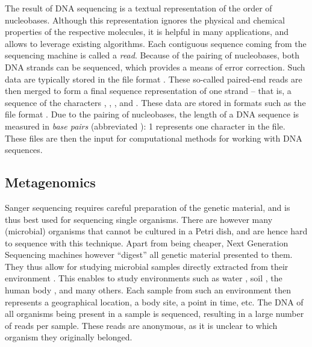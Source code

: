 The result of DNA sequencing is a textual representation of the order of nucleobases.
Although this representation ignores the physical and chemical properties of the respective molecules,
it is helpful in many applications, and allows to leverage existing algorithms.
Each contiguous sequence coming from the sequencing machine is called a \emph{read}.
Because of the pairing of nucleobases,
both DNA strands can be sequenced, which provides a means of error correction.
Such data are typically stored in the  file format \citep{Cock2009}.
These so-called paired-end reads are then merged to form a final sequence representation of one strand
-- that is, a sequence of the characters , , , and .
These data are stored in formats such as the  file format \citep{Pearson1988}.
Due to the pairing of nucleobases,
the length of a DNA sequence is measured in \emph{base pairs} (abbreviated \si{\basepair}):
\SI{1}{\basepair} represents one character in the file.
These files are then the input for computational methods for working with DNA sequences.



\subsection{Metagenomics}
\label{ch:Foundations:sec:SequenceAnalysis:sub:Metagenomics}

Sanger sequencing requires careful preparation of the genetic material,
and is thus best used for sequencing single organisms.
There are however many (microbial) organisms that cannot be cultured in a Petri dish,
and are hence hard to sequence with this technique.
Apart from being cheaper, Next Generation Sequencing machines however ``digest'' all genetic material presented to them.
They thus allow for studying microbial samples
directly extracted from their environment \citep{Morgan2010,Edwards2013,Sunagawa2013a}.
This enables to study environments such as
water \cite{Karsenti2011,Giner2016,Gran-Stadniczenko2017},
soil \cite{Dupont2016,Mahe2017},
the human body \cite{Huttenhower2012,Methe2012,Matsen2015,Wang2015},
and many others.
Each sample from such an environment then represents a geographical location, a body site, a point in time, etc.
The DNA of all organisms being present in a sample is sequenced,
resulting in a large number of reads per sample.
These reads are anonymous, as it is unclear to which organism they originally belonged.

